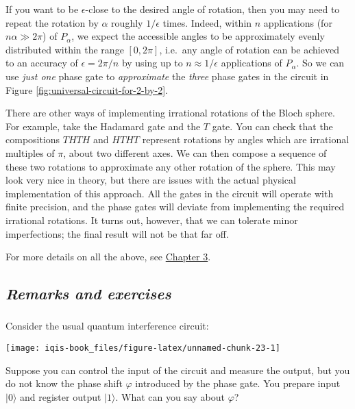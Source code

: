 \documentclass[fleqn]{article}
\begin{document}
If you want to be \(\epsilon\)-close to the desired angle of rotation, then you may need to repeat the rotation by \(\alpha\) roughly \(1/\epsilon\) times.
Indeed, within \(n\) applications (for \(n\alpha\gg 2\pi\)) of \(P_\alpha\), we expect the accessible angles to be approximately evenly distributed within the range \([0,2\pi]\), i.e.~any angle of rotation can be achieved to an accuracy of \(\epsilon=2\pi/n\) by using up to \(n\approx 1/\epsilon\) applications of \(P_\alpha\).
So we can use \emph{just one} phase gate to \emph{approximate} the \emph{three} phase gates in the circuit in Figure \ref{fig:universal-circuit-for-2-by-2}.

There are other ways of implementing irrational rotations of the Bloch sphere.
For example, take the Hadamard gate and the \(T\) gate.
You can check that the compositions \(THTH\) and \(HTHT\) represent rotations by angles which are irrational multiples of \(\pi\), about two different axes.
We can then compose a sequence of these two rotations to approximate any other rotation of the sphere.
This may look very nice in theory, but there are issues with the actual physical implementation of this approach.
All the gates in the circuit will operate with finite precision, and the phase gates will deviate from implementing the required irrational rotations.
It turns out, however, that we can tolerate minor imperfections; the final result will not be that far off.

For more details on all the above, see \protect\hyperlink{chapter3}{Chapter 3}.

\hypertarget{remarks-and-exercises-1}{%
\subsection{\texorpdfstring{\emph{Remarks and exercises}}{Remarks and exercises}}\label{remarks-and-exercises-1}}

\hypertarget{section-11}{%
\subsubsection{}\label{section-11}}

Consider the usual quantum interference circuit:

\begin{center}\texttt{[image: iqis-book\_files/figure-latex/unnamed-chunk-23-1]} \end{center}

Suppose you can control the input of the circuit and measure the output, but you do not know the phase shift \(\varphi\) introduced by the phase gate.
You prepare input \(|0\rangle\) and register output \(|1\rangle\).
What can you say about \(\varphi\)?
\end{document}
